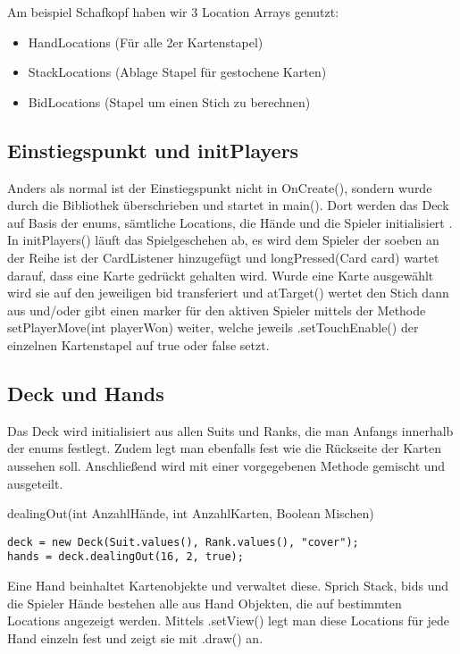 Am beispiel Schafkopf haben wir 3 Location Arrays genutzt:

\begin{itemize}
\item HandLocations (Für alle 2er Kartenstapel)
\item StackLocations (Ablage Stapel für gestochene Karten)
\item BidLocations (Stapel um einen Stich zu berechnen)
\end{itemize}

\subsection{Einstiegspunkt und initPlayers}

Anders als normal ist der Einstiegspunkt nicht in OnCreate(), sondern wurde
durch die Bibliothek überschrieben und startet in main(). Dort werden das Deck
auf Basis der enums, sämtliche Locations, die Hände und die Spieler
initialisiert . In initPlayers() läuft das Spielgeschehen ab, es wird dem
Spieler der soeben an der Reihe ist der CardListener hinzugefügt und
longPressed(Card card) wartet darauf, dass eine Karte gedrückt gehalten wird.
Wurde eine Karte ausgewählt wird sie auf den jeweiligen bid transferiert und
atTarget() wertet den Stich dann aus und/oder gibt einen marker für den aktiven
Spieler mittels der Methode setPlayerMove(int playerWon) weiter, welche jeweils
.setTouchEnable() der einzelnen Kartenstapel auf true oder false setzt.

\subsection{Deck und Hands}

Das Deck wird initialisiert aus allen Suits und Ranks, die man Anfangs innerhalb
der enums festlegt. Zudem legt man ebenfalls fest wie die Rückseite der Karten
aussehen soll. Anschließend wird mit einer vorgegebenen Methode gemischt und
ausgeteilt.

dealingOut(int AnzahlHände, int AnzahlKarten, Boolean Mischen)

\begin{lstlisting}
deck = new Deck(Suit.values(), Rank.values(), "cover");
hands = deck.dealingOut(16, 2, true);
\end{lstlisting}

Eine Hand beinhaltet Kartenobjekte und verwaltet diese. Sprich Stack, bids und
die Spieler Hände bestehen alle aus Hand Objekten, die auf bestimmten Locations
angezeigt werden. Mittels .setView() legt man diese Locations für jede Hand
einzeln fest und zeigt sie mit .draw() an.

